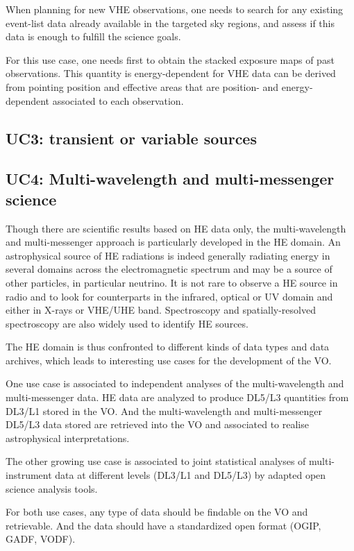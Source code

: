 \documentclass[11pt,a4paper]{ivoa}
\begin{document}
When planning for new VHE observations, one needs to search for any existing event-list data already available in the
targeted sky regions, and assess if this data is enough to fulfill the science goals.

For this use case, one needs first to obtain the stacked exposure maps of past observations. This quantity is
energy-dependent for VHE data can be derived from pointing position and effective areas that are position- and energy-
dependent associated to each observation.


\subsection{UC3: transient or variable sources}




\subsection{UC4: Multi-wavelength and multi-messenger science}

Though there are scientific results based on HE data only, the multi-wavelength and multi-messenger approach is
particularly developed in the HE domain. An astrophysical source of HE radiations is indeed generally radiating
energy in several domains across the electromagnetic spectrum and may be a source of other particles, in particular
neutrino. It is not rare to observe a HE source in radio and to look for counterparts in the infrared, optical or UV
domain and either in X-rays or VHE/UHE band. Spectroscopy and spatially-resolved spectroscopy are also widely used to
identify HE sources.

The HE domain is thus confronted to different kinds of data types and data archives, which leads to interesting use
cases for the development of the VO.

One use case is associated to independent analyses of the multi-wavelength and multi-messenger data. HE data are
analyzed to produce DL5/L3 quantities from DL3/L1 stored in the VO. And the multi-wavelength and multi-messenger
DL5/L3 data stored are retrieved into the VO and associated to realise astrophysical interpretations.

The other growing use case is associated to joint statistical analyses of multi-instrument data at different levels
(DL3/L1 and DL5/L3) by adapted open science analysis tools.

For both use cases, any type of data should be findable on the VO and retrievable. And the data should have a
standardized open format (OGIP, GADF, VODF).
\end{document}
